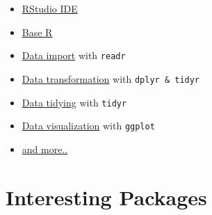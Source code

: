 \documentclass[
]{scrartcl}
\providecommand{\tightlist}{%
  \setlength{\itemsep}{0pt}\setlength{\parskip}{0pt}}
\begin{document}
\begin{itemize}
\tightlist
\item
  \href{https://raw.githubusercontent.com/rstudio/cheatsheets/main/rstudio-ide.pdf}{RStudio IDE}
\item
  \href{https://raw.githubusercontent.com/rstudio/cheatsheets/master/base-r.pdf}{Base R}
\item
  \href{https://raw.githubusercontent.com/rstudio/cheatsheets/main/data-import.pdf}{Data import} with \texttt{readr}
\item
  \href{https://raw.githubusercontent.com/rstudio/cheatsheets/main/data-transformation.pdf}{Data transformation} with \texttt{dplyr\ \&\ tidyr}
\item
  \href{https://raw.githubusercontent.com/rstudio/cheatsheets/master/tidyr.pdf}{Data tidying} with \texttt{tidyr}
\item
  \href{https://raw.githubusercontent.com/rstudio/cheatsheets/main/data-visualization.pdf}{Data visualization} with \texttt{ggplot}
\item
  \href{https://rstudio.com/resources/cheatsheets/}{and more..}
\end{itemize}

\section{Interesting Packages}\label{packagelist}
\end{document}
